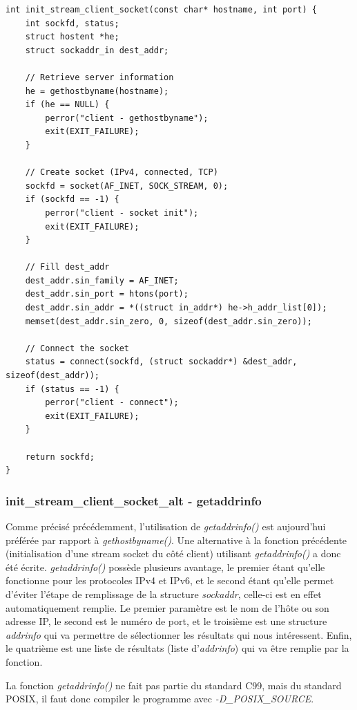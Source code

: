 \begin{lstlisting}
int init_stream_client_socket(const char* hostname, int port) {
    int sockfd, status;
    struct hostent *he;
    struct sockaddr_in dest_addr;

    // Retrieve server information
    he = gethostbyname(hostname);
    if (he == NULL) {
        perror("client - gethostbyname");
        exit(EXIT_FAILURE);
    }

    // Create socket (IPv4, connected, TCP)
    sockfd = socket(AF_INET, SOCK_STREAM, 0);
    if (sockfd == -1) {
        perror("client - socket init");
        exit(EXIT_FAILURE);
    }

    // Fill dest_addr
    dest_addr.sin_family = AF_INET;
    dest_addr.sin_port = htons(port);
    dest_addr.sin_addr = *((struct in_addr*) he->h_addr_list[0]);
    memset(dest_addr.sin_zero, 0, sizeof(dest_addr.sin_zero));

    // Connect the socket
    status = connect(sockfd, (struct sockaddr*) &dest_addr, sizeof(dest_addr));
    if (status == -1) {
        perror("client - connect");
        exit(EXIT_FAILURE);
    }

    return sockfd;
}
\end{lstlisting}

\subsubsection{init\_stream\_client\_socket\_alt - getaddrinfo}
Comme précisé précédemment, l'utilisation de \emph{getaddrinfo()} est aujourd'hui préférée par rapport à \emph{gethostbyname()}. Une alternative à la fonction précédente (initialisation d'une stream socket du côté client) utilisant \emph{getaddrinfo()} a donc été écrite. \emph{getaddrinfo()} possède plusieurs avantage, le premier étant qu'elle fonctionne pour les protocoles IPv4 et IPv6, et le second étant qu'elle permet d'éviter l'étape de remplissage de la structure \emph{sockaddr}, celle-ci est en effet automatiquement remplie. Le premier paramètre est le nom de l'hôte ou son adresse IP, le second est le numéro de port, et le troisième est une structure \emph{addrinfo} qui va permettre de sélectionner les résultats qui nous intéressent. Enfin, le quatrième est une liste de résultats (liste d'\emph{addrinfo}) qui va être remplie par la fonction.\\

\begin{mdframed}[backgroundcolor=lightblue, linecolor=darkblue]
La fonction \emph{getaddrinfo()} ne fait pas partie du standard C99, mais du standard POSIX, il faut donc compiler le programme avec \emph{-D\_POSIX\_SOURCE}.
\end{mdframed}

